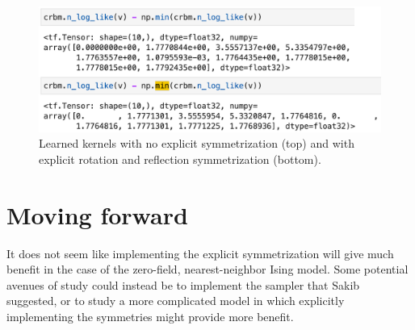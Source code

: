 \documentclass[12pt]{article}
\begin{document}
\begin{figure}[h!]
\begin{center}
    \includegraphics[width=1.0\columnwidth]{figures/symmetrizedVSnonSymm_free_energies.png}
\end{center}
\caption{Learned kernels with no explicit symmetrization (top) and with explicit rotation and reflection symmetrization (bottom).}
\label{fig:symm_vs_nonSymm_free_energies}
\end{figure}

\section{Moving forward}

It does not seem like implementing the explicit symmetrization will give much benefit in the case of the zero-field, nearest-neighbor Ising model. Some potential avenues of study could instead be to implement the sampler that Sakib suggested, or to study a more complicated model in which explicitly implementing the symmetries might provide more benefit.






\end{document}
